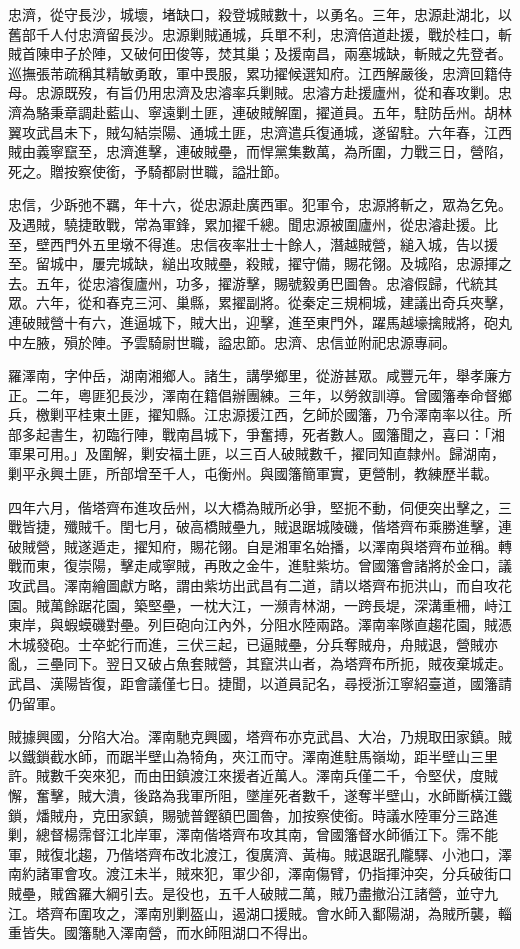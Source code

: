 \begin{pinyinscope}
忠濟，從守長沙，城壞，堵缺口，殺登城賊數十，以勇名。三年，忠源赴湖北，以舊部千人付忠濟留長沙。忠源剿賊通城，兵單不利，忠濟倍道赴援，戰於桂口，斬賊首陳申子於陣，又破何田俊等，焚其巢；及援南昌，兩塞城缺，斬賊之先登者。巡撫張芾疏稱其精敏勇敢，軍中畏服，累功擢候選知府。江西解嚴後，忠濟回籍侍母。忠源既歿，有旨仍用忠濟及忠濬率兵剿賊。忠濬方赴援廬州，從和春攻剿。忠濟為駱秉章調赴藍山、寧遠剿土匪，連破賊解圍，擢道員。五年，駐防岳州。胡林翼攻武昌未下，賊勾結崇陽、通城土匪，忠濟遣兵復通城，遂留駐。六年春，江西賊由義寧竄至，忠濟進擊，連破賊壘，而悍黨集數萬，為所圍，力戰三日，營陷，死之。贈按察使銜，予騎都尉世職，謚壯節。

忠信，少跅弛不羈，年十六，從忠源赴廣西軍。犯軍令，忠源將斬之，眾為乞免。及遇賊，驍捷敢戰，常為軍鋒，累加擢千總。聞忠源被圍廬州，從忠濬赴援。比至，壁西門外五里墩不得進。忠信夜率壯士十餘人，潛越賊營，縋入城，告以援至。留城中，屢完城缺，縋出攻賊壘，殺賊，擢守備，賜花翎。及城陷，忠源揮之去。五年，從忠濬復廬州，功多，擢游擊，賜號毅勇巴圖魯。忠濬假歸，代統其眾。六年，從和春克三河、巢縣，累擢副將。從秦定三規桐城，建議出奇兵夾擊，連破賊營十有六，進逼城下，賊大出，迎擊，進至東門外，躍馬越壕擒賊將，砲丸中左腋，殞於陣。予雲騎尉世職，謚忠節。忠濟、忠信並附祀忠源專祠。

羅澤南，字仲岳，湖南湘鄉人。諸生，講學鄉里，從游甚眾。咸豐元年，舉孝廉方正。二年，粵匪犯長沙，澤南在籍倡辦團練。三年，以勞敘訓導。曾國籓奉命督鄉兵，檄剿平桂東土匪，擢知縣。江忠源援江西，乞師於國籓，乃令澤南率以往。所部多起書生，初臨行陣，戰南昌城下，爭奮搏，死者數人。國籓聞之，喜曰：「湘軍果可用。」及圍解，剿安福土匪，以三百人破賊數千，擢同知直隸州。歸湖南，剿平永興土匪，所部增至千人，屯衡州。與國籓簡軍實，更營制，教練歷半載。

四年六月，偕塔齊布進攻岳州，以大橋為賊所必爭，堅扼不動，伺便突出擊之，三戰皆捷，殲賊千。閏七月，破高橋賊壘九，賊退踞城陵磯，偕塔齊布乘勝進擊，連破賊營，賊遂遁走，擢知府，賜花翎。自是湘軍名始播，以澤南與塔齊布並稱。轉戰而東，復崇陽，擊走咸寧賊，再敗之金牛，進駐紫坊。曾國籓會諸將於金口，議攻武昌。澤南繪圖獻方略，謂由紫坊出武昌有二道，請以塔齊布扼洪山，而自攻花園。賊萬餘踞花園，築堅壘，一枕大江，一瀕青林湖，一跨長堤，深溝重柵，峙江東岸，與蝦蟆磯對壘。列巨砲向江內外，分阻水陸兩路。澤南率隊直趨花園，賊憑木城發砲。士卒蛇行而進，三伏三起，已逼賊壘，分兵奪賊舟，舟賊退，營賊亦亂，三壘同下。翌日又破占魚套賊營，其竄洪山者，為塔齊布所扼，賊夜棄城走。武昌、漢陽皆復，距會議僅七日。捷聞，以道員記名，尋授浙江寧紹臺道，國籓請仍留軍。

賊據興國，分陷大冶。澤南馳克興國，塔齊布亦克武昌、大冶，乃規取田家鎮。賊以鐵鎖截水師，而踞半壁山為犄角，夾江而守。澤南進駐馬嶺坳，距半壁山三里許。賊數千突來犯，而由田鎮渡江來援者近萬人。澤南兵僅二千，令堅伏，度賊懈，奮擊，賊大潰，後路為我軍所阻，墜崖死者數千，遂奪半壁山，水師斷橫江鐵鎖，燔賊舟，克田家鎮，賜號普鏗額巴圖魯，加按察使銜。時議水陸軍分三路進剿，總督楊霈督江北岸軍，澤南偕塔齊布攻其南，曾國籓督水師循江下。霈不能軍，賊復北趨，乃偕塔齊布改北渡江，復廣濟、黃梅。賊退踞孔隴驛、小池口，澤南約諸軍會攻。渡江未半，賊來犯，軍少卻，澤南傷臂，仍指揮沖突，分兵破街口賊壘，賊酋羅大綱引去。是役也，五千人破賊二萬，賊乃盡撤沿江諸營，並守九江。塔齊布圍攻之，澤南別剿盔山，遏湖口援賊。會水師入鄱陽湖，為賊所襲，輜重皆失。國籓馳入澤南營，而水師阻湖口不得出。


\end{pinyinscope}
